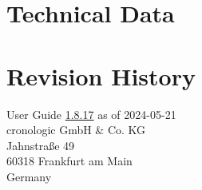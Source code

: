 \documentclass[12pt,notitlepage,a4paper]{report}
\newcommand{\ifxHPTDC}[2]{#1}
\newcommand{\ifxHPTDC}[2]{#2}
\newcommand{\ttinput}[1]{}
\newcommand{\ttinput}[1]{}
\newcommand{\ttinput}[1]{}
\newcommand{\ugrev}{{1.8.17}}
\begin{document}
    \chapter{Technical Data}    
        \ttinput{Tech.tex} 
        
    
    \chapter{Revision History} 
        \noindent
        User Guide \hyperlink{ugrev}{\ugrev} as of 2024-05-21\\  %
        cronologic GmbH \& Co. KG\\
        Jahnstraße 49\\
        60318 Frankfurt am Main\\Germany\\
        \ttinput{FwRev.tex}
        \ifxHPTDC{}{} 
        

    \ifxHPTDC{}{
    \phantomsection
    \addcontentsline{toc}{chapter}{Erratum}
    \chapter*{Erratum}
        
    }
\end{document}
